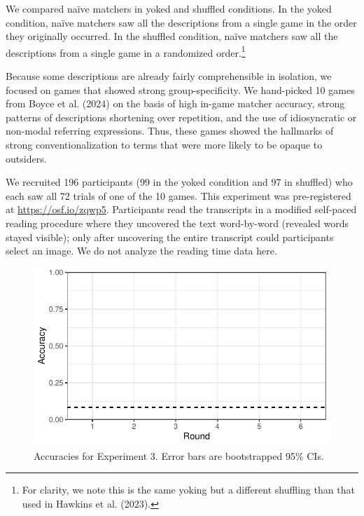 \documentclass[10pt, letterpaper]{article}
\begin{document}
We compared naïve matchers in yoked and shuffled conditions. In the
yoked condition, naïve matchers saw all the descriptions from a single
game in the order they originally occurred. In the shuffled condition,
naïve matchers saw all the descriptions from a single game in a
randomized order.\footnote{For clarity, we note this is the same yoking
  but a different shuffling than that used in Hawkins et al. (2023).}

Because some descriptions are already fairly comprehensible in
isolation, we focused on games that showed strong group-specificity. We
hand-picked 10 games from Boyce et al. (2024) on the basis of high
in-game matcher accuracy, strong patterns of descriptions shortening
over repetition, and the use of idiosyncratic or non-modal referring
expressions. Thus, these games showed the hallmarks of strong
conventionalization to terms that were more likely to be opaque to
outsiders.

We recruited 196 participants (99 in the yoked condition and 97 in
shuffled) who each saw all 72 trials of one of the 10 games. This
experiment was pre-registered at \url{https://osf.io/zqwp5}.
Participants read the transcripts in a modified self-paced reading
procedure where they uncovered the text word-by-word (revealed words
stayed visible); only after uncovering the entire transcript could
participants select an image. We do not analyze the reading time data
here.

\begin{CodeChunk}
\begin{figure}[t]

{\centering \includegraphics[width=0.9\linewidth]{figs/fig-yoked-1} 

}

\caption[Accuracies for Experiment 3]{Accuracies for Experiment 3. Error bars are bootstrapped 95\% CIs. \label{yoked}}\label{fig:fig-yoked}
\end{figure}
\end{CodeChunk}
\end{document}
